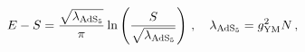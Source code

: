 \begin{equation}
\label{E-S-QCD}
E-S = \frac{\sqrt{\lambda_{{\rm  AdS}_5}}}{\pi} \ln\left(\frac{S}
{\sqrt{\lambda_{{\rm AdS}_5}}}\right)\,,
\quad \lambda_{{\rm AdS}_5}=g_{\rm YM}^2 N\,,
\end{equation}

